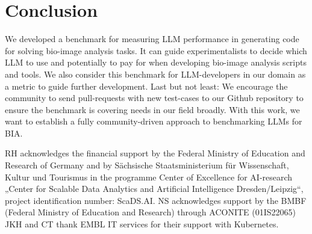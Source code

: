 \documentclass{ecai}
\begin{document}

\section{Conclusion}

We developed a benchmark for measuring LLM performance in generating code for solving bio-image analysis tasks. It can guide experimentalists to decide which LLM to use and potentially to pay for when developing bio-image analysis scripts and tools. We also consider this benchmark for LLM-developers in our domain as a metric to guide further development. Last but not least: We encourage the community to send pull-requests with new test-cases to our Github repository to ensure the benchmark is covering needs in our field broadly. With this work, we want to establish a fully community-driven approach to benchmarking LLMs for BIA. 




\begin{ack}
RH acknowledges the financial support by the Federal Ministry of Education and Research of Germany and by Sächsische Staatsministerium für Wissenschaft, Kultur und Tourismus in the programme Center of Excellence for AI-research „Center for Scalable Data Analytics and Artificial Intelligence Dresden/Leipzig“, project identification number: ScaDS.AI.
NS acknowledges support by the BMBF (Federal Ministry of Education and Research) through ACONITE (01IS22065)
JKH and CT thank EMBL IT services for their support with Kubernetes.

\end{ack}




\end{document}
